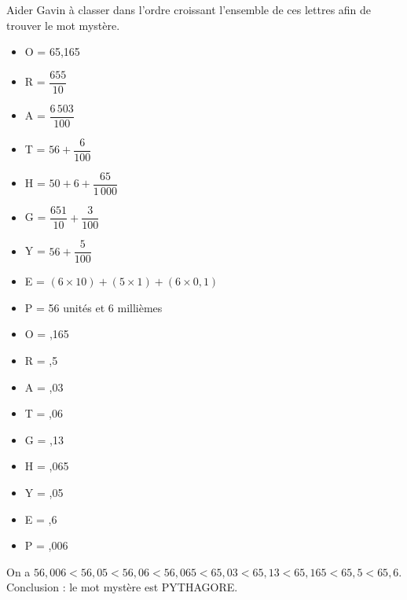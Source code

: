 \begin{exercice} %
    Aider Gavin à classer dans l'ordre croissant l'ensemble de ces lettres afin de trouver le mot mystère. \smallskip
    \begin{itemize}
       \item O = 65,165 \medskip
       \item R = $\dfrac{655}{10}$ \medskip
       \item A = $\dfrac{6\,503}{100}$ \medskip
       \item T = $56+\dfrac{6}{100}$ \medskip
       \item H = $50+6+\dfrac{65}{1\,000}$ \medskip
       \item G = $\dfrac{651}{10}+\dfrac{3}{100}$ \medskip
       \item Y = $56+\dfrac{5}{100}$ \medskip
       \item E = $(6\times10)+(5\times1)+(6\times0,1)$ \smallskip
       \item P = 56 unités et 6 millièmes
    \end{itemize}

 \end{exercice}
 
 \begin{corrige}
    \begin{itemize}
       \item O = ,165
       \item R = ,5
       \item A = ,03
       \item T = ,06
       \item G = ,13
       \item H = ,065
       \item Y = ,05
       \item E = ,6
       \item P = ,006
    \end{itemize}
    On a {\blue $56,006 < 56,05 < 56,06 < 56,065 < 65,03 < 65,13 < 65,165 < 65,5 < 65,6$}. \\
    Conclusion : le mot mystère est \blue PYTHAGORE. \\
 \end{corrige}